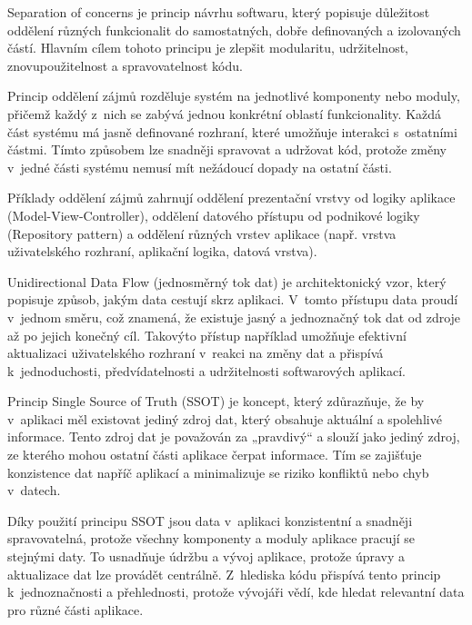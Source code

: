 Separation of concerns je princip návrhu softwaru, který popisuje důležitost oddělení různých funkcionalit do samostatných, dobře definovaných a izolovaných částí. \cite{sapSep}
Hlavním cílem tohoto principu je zlepšit modularitu, udržitelnost, znovupoužitelnost a spravovatelnost kódu.

Princip oddělení zájmů rozděluje systém na jednotlivé komponenty nebo moduly, přičemž každý z~nich se zabývá jednou konkrétní 
oblastí funkcionality. Každá část systému má jasně definované rozhraní, které umožňuje interakci s~ostatními částmi. \cite{sapSep}
Tímto způsobem lze snadněji spravovat a udržovat kód, protože změny v~jedné části systému nemusí mít nežádoucí dopady na ostatní části.

Příklady oddělení zájmů zahrnují oddělení prezentační vrstvy od logiky aplikace (Model-View-Controller), oddělení datového přístupu od 
podnikové logiky (Repository pattern) a oddělení různých vrstev aplikace (např. vrstva uživatelského rozhraní, aplikační logika, datová vrstva). 

Unidirectional Data Flow (jednosměrný tok dat) je architektonický vzor, který popisuje způsob, jakým data cestují skrz aplikaci. \cite{andDocArch}
V~tomto přístupu data proudí v~jednom směru, což znamená, že existuje jasný a jednoznačný tok dat od zdroje až po jejich konečný cíl.
Takovýto přístup například umožňuje efektivní aktualizaci uživatelského rozhraní v~reakci na změny dat a přispívá k~jednoduchosti, 
předvídatelnosti a udržitelnosti softwarových aplikací.

Princip Single Source of Truth (SSOT) je koncept, který zdůrazňuje, že by v~aplikaci měl existovat jediný 
zdroj dat, který obsahuje aktuální a spolehlivé informace. \cite{andDocArch} Tento zdroj dat je považován za „pravdivý“ a slouží jako jediný zdroj, 
ze kterého mohou ostatní části aplikace čerpat informace. Tím se zajišťuje konzistence dat napříč aplikací a minimalizuje se riziko 
konfliktů nebo chyb v~datech.

Díky použití principu SSOT jsou data v~aplikaci konzistentní a snadněji spravovatelná, protože všechny komponenty a moduly aplikace pracují se stejnými 
daty. To usnadňuje údržbu a vývoj aplikace, protože úpravy a aktualizace dat lze provádět centrálně. Z~hlediska kódu přispívá tento
princip k~jednoznačnosti a přehlednosti, protože vývojáři vědí, kde hledat relevantní data pro různé části aplikace.

